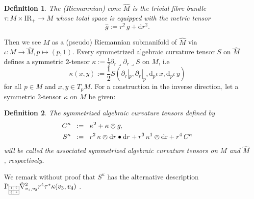 \documentclass[11pt,a4paper]{article}
\theoremstyle{plain}
\newtheorem{definition}{Definition}
\theoremstyle{remark}
\newcommand{\R}{\mathrm{I\!R}}
\newcommand{\dr}{\mathrm{dr}}
\renewcommand{\d}{\mathrm{d}}
\newcommand{\rmP}{\mathrm{P}}
\def\pd{\partial}
\begin{document}
\bigskip
\begin{definition}
The (Riemannian) cone $\hat M$ is the trivial fibre bundle  $\tau \colon M\times \R_+ \to M$ whose total space is equipped with the metric tensor
\begin{equation}\label{eq.cone}
  \hat g := r^2\, g  +  \d r^2.
\end{equation}
\end{definition}
Then we see $M$ as a (pseudo) Riemannian submanifold of $\hat M$ via $\iota \colon M\to
\hat M,p\mapsto (p,1)$. Every symmetrized algebraic curvature tensor $S$ on $\hat M$ 
defines a symmetric 2-tensor $\kappa := \frac{1}{2} \pd_r\lrcorner\pd_r \lrcorner  S$ on $M$, i.e
\begin{equation}\label{eq:kanonische_konstruktion_von_killingtensoren}
\kappa(x,y) := \frac{1}{2} S(\pd_r|_p,\pd_r|_p,\d_p \iota\, x,\d_p \iota\, y)
\end{equation}
for all $p\in M$ and $x,y\in T_pM$. For a construction in the inverse
direction, let a symmetric 2-tensor $\kappa$ on $M$ be given:

\bigskip
\begin{definition}
The symmetrized algebraic curvature tensors defined by
\begin{align}
\label{eq:def_C_kappa}
C^\kappa &\;\;:=\;\; \kappa^2 +  \kappa \owedge g,\\
\label{eq:def_S_kappa}
S^\kappa&\;\;:=\;\; r^2\, \kappa\owedge \d r\bullet \d r + r^3\,
\kappa^1\owedge \dr  + r^4\, C^\kappa
\end{align}
will be called the associated symmetrized algebraic curvature tensors on $M$ and $\hat M$, respectively. 
\end{definition} 

We remark without proof that $S^\kappa$ has the alternative description $\rmP_{\scaleto{\begin{array}{|c|c|}
\cline{1-2}
1 & 2 \\
\cline{1-2}
3 & 4\\
\cline{1-2} 
\end{array}}{12pt}}\hat \nabla^2_{v_1,v_2}r^4\tau^*\kappa(v_3,v_4)$%
.  

\end{document}
